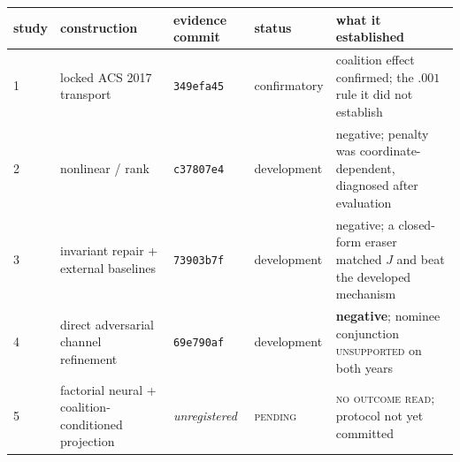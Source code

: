 \begin{tabular}{@{}l p{3.4cm} l l p{5.6cm}@{}}
\toprule
study & construction & evidence commit & status & what it established \\
\midrule
1 & locked ACS 2017 transport & \texttt{349efa45} & confirmatory & coalition effect confirmed; the $.001$ rule it did not establish \\
2 & nonlinear / rank & \texttt{c37807e4} & development & negative; penalty was coordinate-dependent, diagnosed after evaluation \\
3 & invariant repair + external baselines & \texttt{73903b7f} & development & negative; a closed-form eraser matched $J$ and beat the developed mechanism \\
4 & direct adversarial channel refinement & \texttt{69e790af} & development & \textbf{negative}; nominee conjunction \textsc{unsupported} on both years \\
5 & factorial neural + coalition-conditioned projection & \emph{unregistered} & \textsc{pending} & \textsc{no outcome read}; protocol not yet committed \\
\bottomrule
\end{tabular}
